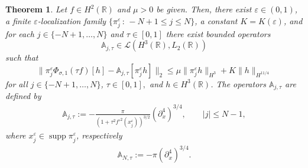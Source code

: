 \documentclass[11pt,reqno]{amsart}
\numberwithin{equation}{section}
\newcommand{\0}{\Omega}
\newcommand{\e}{\varepsilon}
\newcommand{\p}{\partial}
\newcommand{\bA}{\mathbb{A}}
\newcommand{\kL}{\mathcal{L}}
\newcommand{\R}{\mathbb{R}}
\DeclareMathOperator{\supp}{supp}
\newtheorem{thm}{Theorem}[section]
\numberwithin{equation}{section}
\begin{document}
\begin{thm}\label{TK1} 
Let $f\in H^2(\R)$ and    $\mu>0$ be given. Then, there exist $\e\in(0,1)$, a finite $\e$-locali\-za\-tion family  $\{\pi_j^\e\,:\, -N+1\leq j\leq N\} $, a constant $K=K(\e)$, 
and for each  $ j\in\{-N+1,\ldots,N\}$ and $\tau\in[0,1]$ there 
exist bounded operators $$\bA_{ j,\tau}\in\kL(H^3(\R), L_2(\R))$$
 such that 
 \begin{equation}\label{DEK1}
  \|\pi_j^\e \Phi_{\sigma,1}(\tau f)[h]-\bA_{j,\tau}[\pi^\e_j h]\|_{2}\leq \mu \|\pi_j^\e h\|_{H^3}+K\|  h\|_{H^{11/4}}
 \end{equation}
 for all $ j\in\{-N+1,\ldots,N\}$, $\tau\in[0,1],$ and  $h\in H^3(\R)$. The operators $\bA_{j,\tau}$ are defined  by 
  \begin{align*} 
 \bA_{j,\tau }:=- \frac{   \pi}{(1+\tau^2 f'^2(x_j^\e) )^{3/2}}   (\p_x^4 )^{3/4}, \qquad |j|\leq N-1, 
 \end{align*}
 where $x_j^\e\in \supp  \pi_j^\e$, respectively
 \begin{align*} 
 \bA_{N,\tau }:= -  \pi (\p_x^4)^{3/4}. 
 \end{align*}
\end{thm}
\end{document}
